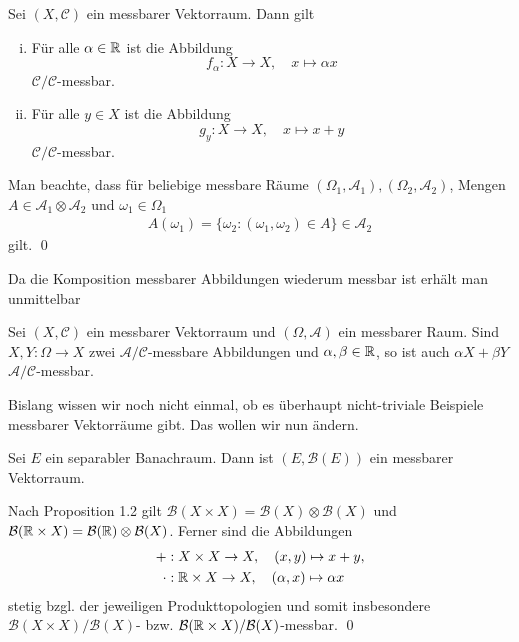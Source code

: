 \begin{remark}
    Sei $(X, \mathcal{C})$ ein messbarer Vektorraum. Dann gilt
    \begin{enumerate}[(i)]
        \item Für alle $\alpha \in \mathbb{R}$ ist die Abbildung 
            $$f_{\alpha}: X \to X, \quad x \mapsto \alpha x$$
        $\mathcal{C}/\mathcal{C}$-messbar. 
        \item Für alle $y \in X$ ist die Abbildung 
            $$g_y: X \to X, \quad x \mapsto x + y$$
        $\mathcal{C}/\mathcal{C}$-messbar.
    \end{enumerate}
\end{remark}
\begin{proof*}
    Man beachte, dass für beliebige  messbare Räume $(\Omega_1, \mathcal{A}_1), (\Omega_2, \mathcal{A}_2)$, Mengen $A \in \mathcal{A}_1 \otimes \mathcal{A}_2$ und $\omega_1 \in \Omega_1$
    \begin{align*}
    A(\omega_1) = \{ \omega_2 : (\omega_1,\omega_2) \in A \} \in \mathcal{A}_2
    \end{align*}
    gilt. \qed
\end{proof*}
Da die Komposition messbarer Abbildungen wiederum messbar ist erhält man unmittelbar
\begin{proposition}
    Sei $(X, \mathcal{C})$ ein messbarer Vektorraum und $(\Omega, \mathcal{A})$ ein messbarer Raum. 
    Sind $X,Y: \Omega \to X$ zwei $\mathcal{A}/\mathcal{C}$-messbare Abbildungen und $\alpha, \beta \in \mathbb{R}$, so ist auch $\alpha X + \beta Y$ $\mathcal{A}/\mathcal{C}$-messbar. 
\end{proposition}

Bislang wissen wir noch nicht einmal, ob es überhaupt nicht-triviale Beispiele messbarer Vektorräume gibt. Das wollen wir nun ändern.  
\begin{proposition}
    Sei $E$ ein separabler Banachraum. Dann ist $(E, \mathcal{B}(E))$ ein messbarer Vektorraum.
\end{proposition}
\begin{proof*}
    Nach Proposition 1.2 gilt $\mathcal{B}(X \times X) = \mathcal{B}(X) \otimes \mathcal{B}(X)$ und 
    $\mathcal{B}(\mathbb{R} \times X) = \mathcal{B}(\mathbb{R}) \otimes \mathcal{B}(X)$. Ferner sind die Abbildungen 
    \begin{align*}
        + &: X \times X \to X, \quad (x,y) \mapsto x + y, \\\
        \cdot &: \mathbb{R} \times X \to X, \quad (\alpha, x) \mapsto \alpha  x
    \end{align*}
    stetig bzgl. der jeweiligen Produkttopologien und somit insbesondere $\mathcal{B}(X \times X)/\mathcal{B}(X)$- bzw. 
    $\mathcal{B}(\mathbb{R} \times X)/\mathcal{B}(X)$-messbar. \qed
\end{proof*}

